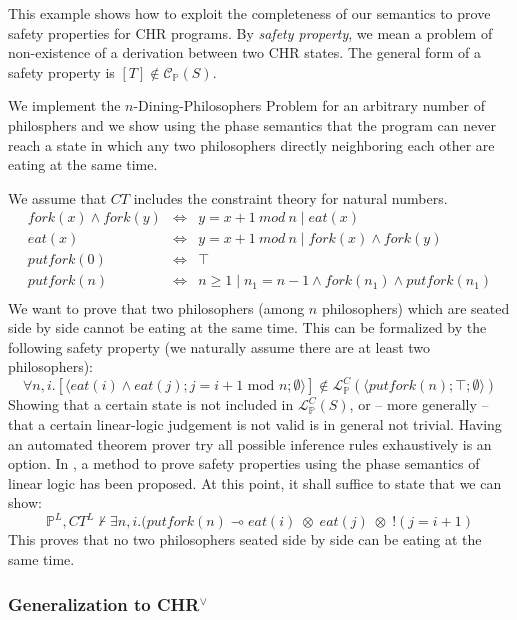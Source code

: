 \documentclass[acmtocl]{acmtrans2m}
\newcommand\state[1]{\langle #1 \rangle}
\newcommand{\bbP}{\ensuremath{\mathbb{P}}}
\newcommand{\cC}{\ensuremath{\mathcal{C}}}
\newcommand{\cL}{\mathcal{L}}
\newcommand{\x}{{\;\otimes\;}}
\newcommand{\lp}{\multimap}
\begin{document}
\begin{example}
	\label{example::philosophers}
This example shows how to exploit the completeness of our semantics
to prove safety properties for CHR programs. By \emph{safety property}, we mean
a problem of non-existence of a derivation between two CHR states. The general
form of a safety property is $[T]\not\in\cC_\bbP(S)$.

We implement the $n$-Dining-Philosophers Problem for an arbitrary
number of philosphers and we show using the phase semantics that the program can
never reach a state in which any two philosophers directly neighboring each
other are eating at the same time.

We assume that $CT$
includes the constraint theory for natural numbers.
\[
  \begin{array}{lcl}
    fork(x)\wedge fork(y) & \Leftrightarrow & y=x+1 ~mod~ n \mid eat(x) \\
    eat(x) & \Leftrightarrow & y=x+1 ~mod~ n\mid fork(x)\wedge fork(y) \\
    putfork(0) & \Leftrightarrow & \top \\
    putfork(n) & \Leftrightarrow & n\geq 1 \mid n_1=n-1 \wedge fork(n_1) \wedge
    putfork(n_1)\\
  \end{array}
\]
We want to prove that two philosophers (among $n$ philosophers) which
are seated side by side cannot be eating at the same time. This can be
formalized by the following safety property (we naturally assume
there are at least two philosophers):
\[
  \forall n,i.
  	[\state{eat(i)\wedge eat(j); j=i+1\textrm{ mod }n;\emptyset}]\not\in
  \cL_\bbP^C(
  \state{putfork(n);\top;\emptyset})
\]
Showing that a certain state is not included in $\cL_\bbP^C(S)$, or -- more
generally -- that a certain linear-logic judgement is not valid is in general
not trivial. Having an automated theorem prover try all possible inference
rules exhaustively is an option. In \cite{Betz2008}, a method to
prove safety properties using the phase semantics of linear logic has been
proposed. At this point, it shall suffice to state that we can show:
\[
  \bbP^L, CT^L \not\vdash \exists n,i.(
  putfork(n) \lp eat(i)\x eat(j)\x!(j=i+1)
\]
This proves that no two philosophers seated side by side can be eating at the
same time.
\end{example}

\subsubsection{Generalization to CHR$^\vee$}
\end{document}
